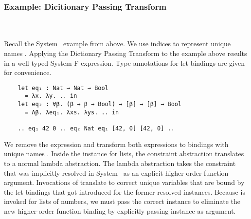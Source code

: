 \subsubsection{Example: Dicitionary Passing Transform}\hfill\\\\
Recall the System \Fo\ example from above. 
We use indices to represent unique names .
Applying the Dictionary Passing Transform to the example above results in a well typed System F expression. Type annotations for let bindings are given for convenience.
\newpage
\begin{verbatim}
    let eq₁ : Nat → Nat → Bool 
      = λx. λy. .. in
    let eq₂ : ∀β. (β → β → Bool) → [β] → [β] → Bool 
      = Λβ. λeq₁. λxs. λys. .. in
    
    .. eq₁ 42 0 .. eq₂ Nat eq₁ [42, 0] [42, 0] .. 
\end{verbatim}
We remove the \inl{|\Decl|}expression and transform both \inl{|\Inst|}expressions to  bindings with unique names . 
Inside the instance for lists, the constraint abstraction translates to a normal lambda abstraction. 
The lambda abstraction takes the constraint that was implicitly resolved in System \Fo\ as an explicit higher-order function argument.
Invocations of  translate to correct unique variables  that are bound by the let bindings that got introduced for the former resolved instances.
Because  is invoked for lists of numbers, we must pass the correct instance to eliminate the new higher-order function binding by explicitly passing instance  as argument.
